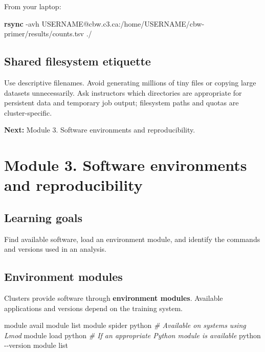 \documentclass[
]{book}
\newenvironment{Shaded}{\begin{snugshade}}{\end{snugshade}}
\newcommand{\AttributeTok}[1]{\textcolor[rgb]{0.13,0.29,0.53}{#1}}
\newcommand{\CommentTok}[1]{\textcolor[rgb]{0.56,0.35,0.01}{\textit{#1}}}
\newcommand{\ExtensionTok}[1]{#1}
\newcommand{\FunctionTok}[1]{\textcolor[rgb]{0.13,0.29,0.53}{\textbf{#1}}}
\newcommand{\NormalTok}[1]{#1}
\begin{document}
From your laptop:

\begin{Shaded}
\begin{Highlighting}[]
\FunctionTok{rsync} \AttributeTok{{-}avh}\NormalTok{ USERNAME@cbw.c3.ca:/home/USERNAME/cbw{-}primer/results/counts.tsv ./}
\end{Highlighting}
\end{Shaded}

\section{Shared filesystem etiquette}\label{shared-filesystem-etiquette}

Use descriptive filenames. Avoid generating millions of tiny files or copying large datasets unnecessarily. Ask instructors which directories are appropriate for persistent data and temporary job output; filesystem paths and quotas are cluster-specific.

\textbf{Next:} Module 3. Software environments and reproducibility.

\chapter{Module 3. Software environments and reproducibility}\label{module-3.-software-environments-and-reproducibility}

\section{Learning goals}\label{learning-goals-2}

Find available software, load an environment module, and identify the commands and versions used in an analysis.

\section{Environment modules}\label{environment-modules}

Clusters provide software through \textbf{environment modules}. Available applications and versions depend on the training system.

\begin{Shaded}
\begin{Highlighting}[]
\ExtensionTok{module}\NormalTok{ avail}
\ExtensionTok{module}\NormalTok{ list}
\ExtensionTok{module}\NormalTok{ spider python       }\CommentTok{\# Available on systems using Lmod}
\ExtensionTok{module}\NormalTok{ load python         }\CommentTok{\# If an appropriate Python module is available}
\ExtensionTok{python} \AttributeTok{{-}{-}version}
\ExtensionTok{module}\NormalTok{ list}
\end{Highlighting}
\end{Shaded}
\end{document}
